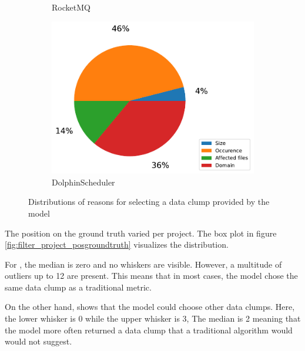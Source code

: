 \begin{figure}[ht!]
\begin{subfigure}[t]{0.44\columnwidth}
        \caption{RocketMQ}
       \label{fig:filter_reason_rocketmq}
    \end{subfigure}
        \begin{subfigure}[t]{0.5\columnwidth}
        \includegraphics[width=1.5\columnwidth]{figures/chapter5/filter_reason_type_dolphin.pdf}
        \caption{DolphinScheduler}
        \label{fig:filter_reason_dolphinscheduler}
    \end{subfigure}

    \caption{Distributions of reasons for selecting a data clump provided by the model }
    
    \label{fig:filter_reason}
\end{figure}

The position on the ground truth varied per project. The box plot in figure \ref{fig:filter_project_posgroundtruth} visualizes the distribution.  

For \argouml, the median is zero and no whiskers  are visible. However, a multitude of outliers up to 12 are present. This means that in most cases, the model chose the same data clump as a traditional metric. 

On the other hand, \rocketmq shows that the model could choose other data clumps. Here, the lower whisker is 0 while the upper whisker is  3, The median is 2 meaning that the model more often returned a data clump that a traditional algorithm would would not suggest.

